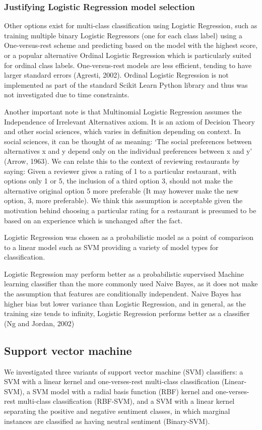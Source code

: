 \documentclass[11pt]{article}
\newcommand{\drafting}[1]{\textcolor{OliveGreen}{#1}}
\begin{document}
\subsubsection*{Justifying Logistic Regression model selection}
\drafting{
Other options exist for multi-class classification using Logistic Regression, such as training multiple binary Logistic Regressors (one for each class label) using a One-versus-rest scheme and predicting based on the model with the highest score, or a popular alternative Ordinal Logistic Regression which is particularly suited for ordinal class labels.
One-versus-rest models are less efficient, tending to have larger standard errors (Agresti, 2002).
Ordinal Logistic Regression is not implemented as part of the standard Scikit Learn Python library and thus was not investigated due to time constraints.
}

\drafting{
Another important note is that Multinomial Logistic Regression assumes the Independence of Irrelevant Alternatives axiom. It is an axiom of Decision Theory and other social sciences, which varies in definition depending on context. In social sciences, it can be thought of as meaning:
`The social preferences between alternatives x and y depend only on the individual preferences between x and y' (Arrow, 1963).
We can relate this to the context of reviewing restaurants by saying:
Given a reviewer gives a rating of 1 to a particular restaurant, with options only 1 or 5, the inclusion of a third option 3, should not make the alternative original option 5 more preferable (It may however make the new option, 3, more preferable).
We think this assumption is acceptable given the motivation behind choosing a particular rating for a restaurant is presumed to be based on an experience which is unchanged after the fact.
}

\drafting{
Logistic Regression was chosen as a probabilistic model as a point of comparison to a linear model such as SVM providing a variety of model types for classification.
}

\drafting{
Logistic Regression may perform better as a probabilistic supervised Machine learning classifier than the more commonly used Naive Bayes, as it does not make the assumption that features are conditionally independent. Naive Bayes has higher bias but lower variance than Logistic Regression, and in general, as the training size tends to infinity, Logistic Regression performs better as a classifier (Ng and Jordan, 2002)
}

\subsection{Support vector machine} \label{subsec:method-svm}
We investigated three variants of support vector machine (SVM) classifiers: a SVM with a linear kernel and one-verses-rest multi-class classification (Linear-SVM), a SVM model with a radial basis function (RBF) kernel and one-verses-rest multi-class classification (RBF-SVM), and a SVM with a linear kernel separating the positive and negative sentiment classes, in which marginal instances are classified as having neutral sentiment (Binary-SVM). 
\end{document}
